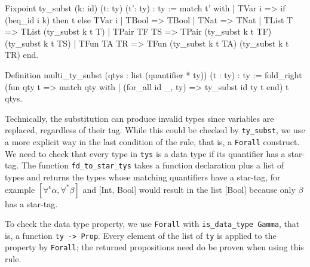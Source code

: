 \documentclass[paper = a4, fleqn, abstract=on, twoside]{scrreprt}
\newcommand{\coqinline}[1]{\texttt{#1}}
\begin{document}
\begin{coqcode}
Fixpoint ty_subst (k: id) (t: ty) (t': ty) : ty :=
  match t' with
  | TVar i      =>  if (beq_id i k) then t else TVar i
  | TBool       => TBool
  | TNat        => TNat
  | TList T     => TList (ty_subst k t T)
  | TPair TF TS => TPair (ty_subst k t TF) (ty_subst k t TS)
  | TFun  TA TR => TFun  (ty_subst k t TA) (ty_subst k t TR)
  end.
\end{coqcode}
\begin{coqcode}
Definition multi_ty_subst (qtys : list (quantifier * ty)) (t : ty) : ty := 
  fold_right (fun qty t => match qty with 
                           | (for_all id _, ty) => ty_subst id ty t
                           end)
              t qtys.
\end{coqcode}
Technically, the substitution can produce invalid types since variables are replaced, regardless of their tag. While this could be checked by \texttt{ty\_subst}, we use a more explicit way in the last condition of the rule, that is, a \coqinline{Forall} construct. We need to check that every type in \coqinline{tys} is a data type if its quantifier has a star-tag. The function \coqinline{fd_to_star_tys} takes a function declaration plus a list of types and returns the types whose matching quantifiers have a star-tag, for example $[\forall^{\epsilon}\alpha, \forall^{*}\beta]$ and [Int, Bool] would result in the list [Bool] because only $\beta$ has a star-tag. 
\par
To check the data type property, we use \coqinline{Forall} with \coqinline{is_data_type Gamma}, that is, a function \coqinline{ty -> Prop}. Every element of the list of \texttt{ty} is applied to the property by \coqinline{Forall}; the returned propositions need do be proven when using this rule.
\end{document}
